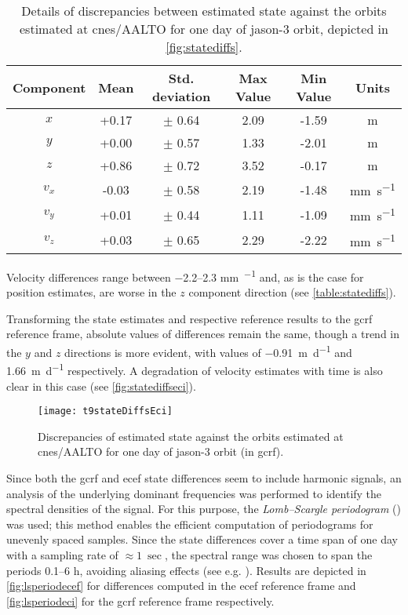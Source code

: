 \begin{table}[h!]
    \centering
    \begin{tabularx}{\textwidth}{cccccc}
        \toprule
        \textbf{Component} & \textbf{Mean} & \textbf{Std. deviation} & \textbf{Max Value} & \textbf{Min Value} & \textbf{Units}\\
        \hline
        $x$   &  +0.17 & $\pm$ 0.64 & 2.09 & -1.59 & \si{\metre}\\
        $y$   &  +0.00 & $\pm$ 0.57 & 1.33 & -2.01 & \si{\metre}\\
        $z$   &  +0.86 & $\pm$ 0.72 & 3.52 & -0.17 & \si{\metre}\\
        $v_x$ &  -0.03 & $\pm$ 0.58 & 2.19 & -1.48 & \si{\milli\metre\per\second}\\
        $v_y$ &  +0.01 & $\pm$ 0.44 & 1.11 & -1.09 & \si{\milli\metre\per\second}\\
        $v_z$ &  +0.03 & $\pm$ 0.65 & 2.29 & -2.22 & \si{\milli\metre\per\second}\\
       \bottomrule
    \end{tabularx}
    \caption{Details of discrepancies between estimated state against the orbits estimated at \gls{cnes}/AALTO for one day of \gls{jason}-3 orbit, depicted in \autoref{fig:statediffs}.}
    \label{table:statediffs}
\end{table}

Velocity differences range between \numrange{-2.2}{2.3} \si{\milli\metre\per\sec} and, as is the 
case for position estimates, are worse in the $z$ component direction (see 
\autoref{table:statediffs}).

Transforming the state estimates and respective reference results to the \gls{gcrf} 
reference frame, absolute values of differences remain the same, though a trend in 
the $y$ and $z$ directions is more evident, with values of \SI{-0.91}{\metre\per\day} 
and \SI{+1.66}{\metre\per\day} respectively. A degradation of velocity estimates with 
time is also clear in this case (see \autoref{fig:statediffseci}).

\begin{figure}[ht]
    \centering
    \texttt{[image: t9stateDiffsEci]}
    \caption{Discrepancies of estimated state against the orbits estimated at \gls{cnes}/AALTO for one day of \gls{jason}-3 orbit (in \gls{gcrf}).}
    \label{fig:statediffseci}
\end{figure}

Since both the \gls{gcrf} and \gls{ecef} state differences seem to include 
harmonic signals, an analysis of the underlying dominant frequencies was performed to 
identify the spectral densities of the signal. For this purpose, the 
\emph{Lomb–Scargle periodogram} (\cite{Scargle1982}) was used; this method enables 
the efficient computation of periodograms for unevenly spaced samples. Since the 
state differences cover a time span of one day with a sampling rate of $\approx \SI{1}{\sec}$, 
the spectral range was chosen to span the periods \numrange{0.1}{6} \si{\hour}, 
avoiding aliasing effects (see e.g. \cite{VanderPlas2018}). Results are depicted in 
\autoref{fig:lsperiodecef} for differences computed in the \gls{ecef} reference frame 
and \autoref{fig:lsperiodeci} for the \gls{gcrf} reference frame respectively.


